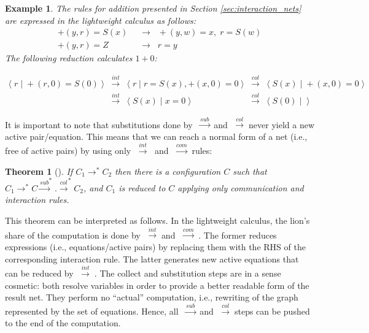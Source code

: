 \documentclass[submission,copyright,creativecommons]{eptcs}
\newcommand{\lwint}{$\;\stackrel{int}{\longrightarrow}\;$}
\newcommand{\lwcom}{$\;\stackrel{com}{\longrightarrow}\;$}
\newcommand{\lwcol}{$\;\stackrel{col}{\longrightarrow}\;$}
\newcommand{\lwsub}{$\;\stackrel{sub}{\longrightarrow}\;$}
\newcommand{\mlwint}{\stackrel{int}{\longrightarrow}}
\newcommand{\mlwcol}{\stackrel{col}{\longrightarrow}}
\newcommand{\mlwsub}{\stackrel{sub}{\longrightarrow}}
\begin{document}
\newtheorem{exp:addition_calculus}{Example}

\begin{exp:addition_calculus}
The rules for addition presented in Section \ref{sec:interaction_nets}
are expressed in the lightweight calculus as follows:
\begin{align}
+(y,r) = S(x) & \;\;\longrightarrow\;\;  +(y, w) = x, \; r = S(w) \\
+(y,r) = Z  &  \;\;\longrightarrow\;\;  r = y
\end{align}
The following reduction calculates $1 + 0$:

\begin{align*}
 	\langle\; r  \;|\;  +(r,0) = S(0)\;\rangle & \mlwint &
 	\langle\; r  \;|\; r=S(x), +(x,0) = 0 \;\rangle
 	&\mlwcol& \langle\; S(x)  \;|\;  +(x,0) = 0\;\rangle \\
 	&\mlwint& \langle\; S(x)  \;|\;  x = 0 \;\rangle
 	&\mlwcol& \langle\; S(0)  \;|\;  \;\rangle
\end{align*}

\end{exp:addition_calculus}

It is important to note that
substitutions done by \lwsub and \lwcol never yield a new active pair/equation.
 This means that we can
reach a normal form of a net (i.e., free of active pairs) by using only \lwint
and \lwcom rules:

\newtheorem{thm_intcom}{Theorem}
\begin{thm_intcom} [\cite{DBLP:journals/eceasst/HassanMS10}]
\label{thm_intcom}
If $C_1 \longrightarrow^* C_2$ then there is a configuration $C$ such that
$C_1 \longrightarrow^* C \mlwsub^* . \mlwcol^* C_2$, and $C_1$ is reduced to
$C$ applying only communication and interaction rules.
\end{thm_intcom}

This theorem can be interpreted as follows. In the lightweight calculus, the
lion's share of the computation is done by \lwint and \lwcom. The former
reduces expressions (i.e., equations/active pairs) by replacing them with the
RHS of the corresponding interaction rule. The latter generates new active
equations that can be reduced by \lwint. The collect and substitution steps are in a sense
cosmetic: both resolve variables in order to provide a better readable form of
the result net. They perform no ``actual'' computation, i.e., rewriting of the
graph represented by the set of equations. Hence, all \lwsub and \lwcol steps
can be pushed to the end of the computation.
\end{document}
